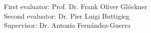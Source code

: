 \documentclass[10 pt, a4paper, twoside, openright]{Thesis}
\begin{document}
\null{}
\vfill{}

First evaluator: Prof. Dr. Frank Oliver Gl\"{o}ckner \\
Second evaluator: Dr. Pier Luigi Buttigieg \\
Supervisor: Dr. Antonio Fern\'{a}ndez-Guerra \\









\end{document}
